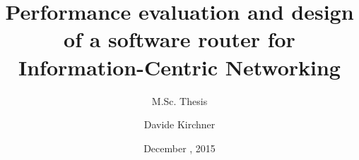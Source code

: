
\usepackage{booktabs}
\usepackage[scale=2]{ccicons}

\usepackage{pgfplots}

\usepackage[vlined]{algorithm2e}
\newcommand{\monobig}[1]{\texttt{#1}}
\newcommand{\mono}[1]{{\footnotesize \ttfamily #1}}
\usepackage{comment}
\usepackage[super]{nth}
\usepackage{verbatim}
\usepackage{listings}
 \lstset{basicstyle=\footnotesize\ttfamily,frame=none}
\usepackage{tikz}
 \usetikzlibrary{positioning}
 \usetikzlibrary{calc}
 \usetikzlibrary{shapes.misc}
\usepackage{relsize}




\newcommand{\extraslidesbegin}{
  \newcounter{framenumbervorappendix}
  \setcounter{framenumbervorappendix}{\value{framenumber}}
}
\newcommand{\extraslidesend}{
  \addtocounter{framenumbervorappendix}{-\value{framenumber}}
  \addtocounter{framenumber}{\value{framenumbervorappendix}} 
}



\title{Performance evaluation and design of a software router for Information-Centric Networking}
\subtitle{M.Sc. Thesis}
\date{December , 2015}
\author{Davide Kirchner}

%



